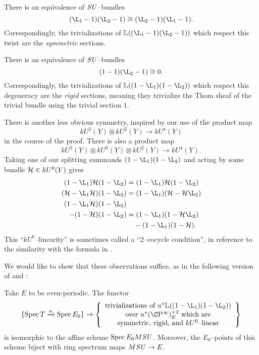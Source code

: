 \begin{example}
There is an equivalence of \(\mathit{SU}\)--bundles \[(\L_1 - 1)(\L_2 - 1) \cong (\L_2 - 1)(\L_1 - 1).\]  Correspondingly, the trivializations of \(\ThomSheaf{(\L_1 - 1)(\L_2 - 1)}\) which respect this twist are the \emph{symmetric} sections.
\end{example}

\begin{example}
There is an equivalence of \(\mathit{SU}\)--bundles \[(1 - 1)(\L_2 - 1) \cong 0.\]  Correspondingly, the trivializations of \(\ThomSheaf{(1 - \L_1)(1 - \L_2)}\) which respect this degeneracy are the \emph{rigid} sections, meaning they trivialize the Thom sheaf of the trivial bundle using the trivial section \(1\).
\end{example}

\begin{example}\label{TwoCocycleConditionForBSUBundles}
There is another less obvious symmetry, inspired by our use of the product map \[kU^2(Y) \otimes kU^2(Y) \to kU^4(Y)\] in the course of the proof.  There is also a product map \[kU^2(Y) \otimes kU^0(Y) \otimes kU^2(Y) \to kU^4(Y).\]  Taking one of our splitting summands \((1 - \L_1)(1 - \L_2)\) and acting by some bundle \(\mathcal{H} \in kU^0(Y)\) gives
\begin{align*}
(1 - \L_1)\sheaf H(1 - \L_2) & = (1 - \L_1)\sheaf H(1 - \L_2) \\
(\sheaf H - \L_1 \sheaf H)(1 - \L_2) & = (1 - \L_1)(\sheaf H - \sheaf H \L_2) \\
(1 - \L_1 \sheaf H)(1 - \L_2) & \\
- (1 - \sheaf H)(1 - \L_2) & = (1 - \L_1)(1 - \sheaf H \L_2) \\
& \quad - (1 - \L_1)(1 - \sheaf H).
\end{align*}
This ``\(kU^0\)--linearity'' is sometimes called a ``\(2\)--cocycle condition'', in reference to the similarity with the formula in .
\end{example}

We would like to show that these observations suffice, as in the following version of  and :
\begin{theorem}\label{BSUTriumvirate}
Take \(E\) to be even-periodic.  The functor \[\{\Spec T \xrightarrow{u} \Spec E_0\} \to \left\{ \begin{array}{c} \text{trivializations of \(u^* \ThomSheaf{(1 - \L_1)(1 - \L_2)}\)} \\ \text{over \(u^* (\CP^\infty)^{\times 2}_E\) which are} \\ \text{symmetric, rigid, and \(kU^0\)--linear} \end{array} \right\}\] is isomorphic to the affine scheme \(\operatorname{Spec} E_0 M\mathit{SU}\).  Moreover, the \(E_0\)--points of this scheme biject with ring spectrum maps \(M\mathit{SU} \to E\).
\end{theorem}


